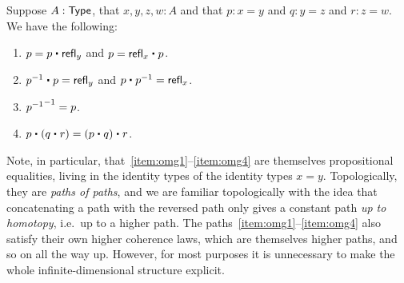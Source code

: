\begin{lem}\label{thm:omg}%
  Suppose $A:\mathsf{Type}$, that $x,y,z,w:A$ and that $p:x= y$ and $q:y = z$ and $r:z=w$.
  We have the following:
  \begin{enumerate}
  \item $p= p\ct \refl{y}$ and $p = \refl{x} \ct p$.\label{item:omg1}
  \item $\opp{p}\ct p=  \refl{y}$ and $p\ct \opp{p}= \refl{x}$.
  \item $\mathord{{\mathord{{p}^{-1}}}^{-1}}= p$.
  \item $p\ct (q\ct r)=  (p\ct q)\ct r$.\label{item:omg4}
  \end{enumerate}
\end{lem}

Note, in particular, that~\ref{item:omg1}--\ref{item:omg4} are themselves propositional equalities, living in the identity types of the identity types $x=y$.
Topologically, they are \emph{paths of paths}, and we are familiar topologically with the idea that concatenating a path with the reversed path only gives a constant path \emph{up to homotopy}, i.e.\ up to a higher path.
The paths~\ref{item:omg1}--\ref{item:omg4} also satisfy their own higher coherence laws, which are themselves higher paths, and so on all the way up.
However, for most purposes it is unnecessary to make the whole infinite-dimensional structure explicit.

